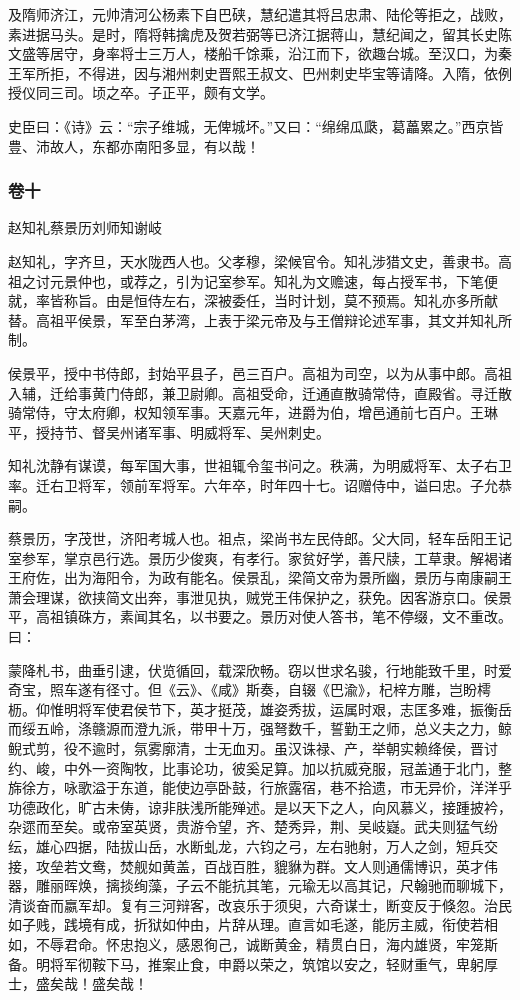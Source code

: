 \documentclass[]{article}
\begin{document}
及隋师济江，元帅清河公杨素下自巴硖，慧纪遣其将吕忠肃、陆伦等拒之，战败，素进据马头。是时，隋将韩擒虎及贺若弼等已济江据蒋山，慧纪闻之，留其长史陈文盛等居守，身率将士三万人，楼船千馀乘，沿江而下，欲趣台城。至汉口，为秦王军所拒，不得进，因与湘州刺史晋熙王叔文、巴州刺史毕宝等请降。入隋，依例授仪同三司。顷之卒。子正平，颇有文学。

史臣曰：《诗》云：``宗子维城，无俾城坏。''又曰：``绵绵瓜瓞，葛藟累之。''西京皆豊、沛故人，东都亦南阳多显，有以哉！

\hypertarget{header-n4513}{%
\subsubsection{卷十}\label{header-n4513}}

赵知礼蔡景历刘师知谢岐

赵知礼，字齐旦，天水陇西人也。父孝穆，梁候官令。知礼涉猎文史，善隶书。高祖之讨元景仲也，或荐之，引为记室参军。知礼为文赡速，每占授军书，下笔便就，率皆称旨。由是恒侍左右，深被委任，当时计划，莫不预焉。知礼亦多所献替。高祖平侯景，军至白茅湾，上表于梁元帝及与王僧辩论述军事，其文并知礼所制。

侯景平，授中书侍郎，封始平县子，邑三百户。高祖为司空，以为从事中郎。高祖入辅，迁给事黄门侍郎，兼卫尉卿。高祖受命，迁通直散骑常侍，直殿省。寻迁散骑常侍，守太府卿，权知领军事。天嘉元年，进爵为伯，增邑通前七百户。王琳平，授持节、督吴州诸军事、明威将军、吴州刺史。

知礼沈静有谋谟，每军国大事，世祖辄令玺书问之。秩满，为明威将军、太子右卫率。迁右卫将军，领前军将军。六年卒，时年四十七。诏赠侍中，谥曰忠。子允恭嗣。

蔡景历，字茂世，济阳考城人也。祖点，梁尚书左民侍郎。父大同，轻车岳阳王记室参军，掌京邑行选。景历少俊爽，有孝行。家贫好学，善尺牍，工草隶。解褐诸王府佐，出为海阳令，为政有能名。侯景乱，梁简文帝为景所幽，景历与南康嗣王萧会理谋，欲挟简文出奔，事泄见执，贼党王伟保护之，获免。因客游京口。侯景平，高祖镇硃方，素闻其名，以书要之。景历对使人答书，笔不停缀，文不重改。曰：

蒙降札书，曲垂引逮，伏览循回，载深欣畅。窃以世求名骏，行地能致千里，时爱奇宝，照车遂有径寸。但《云》、《咸》斯奏，自辍《巴渝》，杞梓方雕，岂盼樗枥。仰惟明将军使君侯节下，英才挺茂，雄姿秀拔，运属时艰，志匡多难，振衡岳而绥五岭，涤赣源而澄九派，带甲十万，强弩数千，誓勤王之师，总义夫之力，鲸鲵式剪，役不逾时，氛雾廓清，士无血刃。虽汉诛禄、产，举朝实赖绛侯，晋讨约、峻，中外一资陶牧，比事论功，彼奚足算。加以抗威兗服，冠盖通于北门，整旆徐方，咏歌溢于东道，能使边亭卧鼓，行旅露宿，巷不拾遗，市无异价，洋洋乎功德政化，旷古未俦，谅非肤浅所能殚述。是以天下之人，向风慕义，接踵披衿，杂遝而至矣。或帝室英贤，贵游令望，齐、楚秀异，荆、吴岐嶷。武夫则猛气纷纭，雄心四据，陆拔山岳，水断虬龙，六钧之弓，左右驰射，万人之剑，短兵交接，攻垒若文鸯，焚舰如黄盖，百战百胜，貔貅为群。文人则通儒博识，英才伟器，雕丽晖焕，摛掞绚藻，子云不能抗其笔，元瑜无以高其记，尺翰驰而聊城下，清谈奋而嬴军却。复有三河辩客，改哀乐于须臾，六奇谋士，断变反于倏忽。治民如子贱，践境有成，折狱如仲由，片辞从理。直言如毛遂，能厉主威，衔使若相如，不辱君命。怀忠抱义，感恩徇己，诚断黄金，精贯白日，海内雄贤，牢笼斯备。明将军彻鞍下马，推案止食，申爵以荣之，筑馆以安之，轻财重气，卑躬厚士，盛矣哉！盛矣哉！
\end{document}
